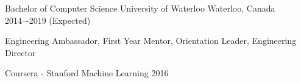 

\begin{cventries}

  \cventry
    {Bachelor of Computer Science} %
    {University of Waterloo} %
    {Waterloo, Canada} %
    {2014–-2019 (Expected)} %
    {
      \begin{cvitems} %
        \item {Engineering Ambassador, First Year Mentor, Orientation Leader, Engineering Director}
      \end{cvitems}
    }

  \cventry
    {Coursera - Stanford Machine Learning} %
    {} %
    {} %
    {2016} %
    {}

\end{cventries}
